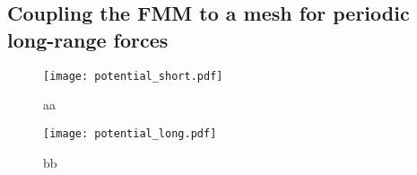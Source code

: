 \subsection{Coupling the FMM to a mesh for periodic long-range forces}
\label{ssec:mesh_summary}

\begin{figure}
\texttt{[image: potential\_short.pdf]}
\caption{aa}
\label{fig:fmm:potential_short}
\end{figure}


\begin{figure}
\texttt{[image: potential\_long.pdf]}
\caption{bb}
\label{fig:fmm:potential_long}
\end{figure}
